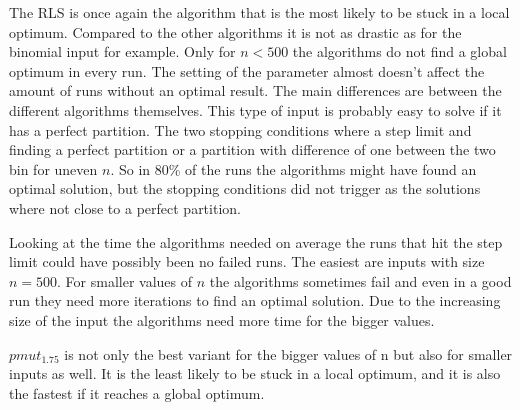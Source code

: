 The RLS is once again the algorithm that is the most likely to be stuck in a local optimum.
Compared to the other algorithms it is not as drastic as for the binomial input for example.
Only for $n<500$ the algorithms do not find a global optimum in every run.
The setting of the parameter almost doesn't affect the amount of runs without an optimal result.
The main differences are between the different algorithms themselves.
This type of input is probably easy to solve if it has a perfect partition.
The two stopping conditions where a step limit and finding a perfect partition or a partition with difference of one between the two bin for uneven $n$.
So in 80\% of the runs the algorithms might have found an optimal solution, but the stopping conditions did not trigger as the solutions where not close to a perfect partition.



Looking at the time the algorithms needed on average the runs that hit the step limit could have possibly been no failed runs.
The easiest are inputs with size $n=500$.
For smaller values of $n$ the algorithms sometimes fail and even in a good run they need more iterations to find an optimal solution.
Due to the increasing size of the input the algorithms need more time for the bigger values.



$pmut_{1.75}$ is not only the best variant for the bigger values of n but also for smaller inputs as well.
It is the least likely to be stuck in a local optimum, and it is also the fastest if it reaches a global optimum.
